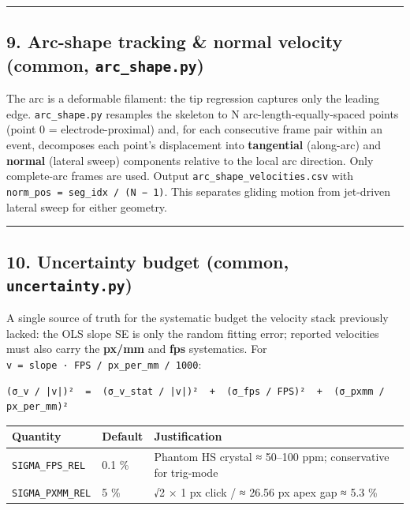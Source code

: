 \documentclass[
  11pt,
]{article}
\begin{document}
\begin{center}\rule{0.5\linewidth}{0.5pt}\end{center}

\hypertarget{9-arc-shape-tracking--normal-velocity-common-arc_shapepy}{%
\subsection{\texorpdfstring{9. Arc-shape tracking \& normal velocity
(common,
\texttt{arc\_shape.py})}{9. Arc-shape tracking \& normal velocity (common, arc\_shape.py)}}\label{9-arc-shape-tracking--normal-velocity-common-arc_shapepy}}

The arc is a deformable filament: the tip regression captures only the
leading edge. \texttt{arc\_shape.py} resamples the skeleton to N
arc-length-equally-spaced points (point 0 = electrode-proximal) and, for
each consecutive frame pair within an event, decomposes each point's
displacement into \textbf{tangential} (along-arc) and \textbf{normal}
(lateral sweep) components relative to the local arc direction. Only
complete-arc frames are used. Output \texttt{arc\_shape\_velocities.csv}
with \texttt{norm\_pos\ =\ seg\_idx\ /\ (N\ −\ 1)}. This separates
gliding motion from jet-driven lateral sweep for either geometry.

\begin{center}\rule{0.5\linewidth}{0.5pt}\end{center}

\hypertarget{10-uncertainty-budget-common-uncertaintypy}{%
\subsection{\texorpdfstring{10. Uncertainty budget (common,
\texttt{uncertainty.py})}{10. Uncertainty budget (common, uncertainty.py)}}\label{10-uncertainty-budget-common-uncertaintypy}}

A single source of truth for the systematic budget the velocity stack
previously lacked: the OLS slope SE is only the random fitting error;
reported velocities must also carry the \textbf{px/mm} and \textbf{fps}
systematics. For \texttt{v\ =\ slope\ ·\ FPS\ /\ px\_per\_mm\ /\ 1000}:

\begin{verbatim}
(σ_v / |v|)²  =  (σ_v_stat / |v|)²  +  (σ_fps / FPS)²  +  (σ_pxmm / px_per_mm)²
\end{verbatim}

\begin{longtable}[]{@{}lll@{}}
\toprule
Quantity & Default & Justification\tabularnewline
\midrule
\endhead
\texttt{SIGMA\_FPS\_REL} & 0.1 \% & Phantom HS crystal ≈ 50--100 ppm;
conservative for trig-mode\tabularnewline
\texttt{SIGMA\_PXMM\_REL} & 5 \% & √2 × 1 px click / ≈ 26.56 px apex gap
≈ 5.3 \%\tabularnewline
\bottomrule
\end{longtable}
\end{document}
